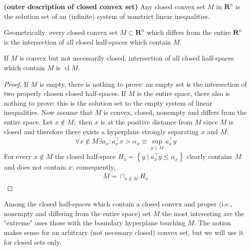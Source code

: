 \documentclass{article}
\newcommand{\bfs}[1]{\textbf{({#1}) }}
\newcommand{\cl}{\operatorname{cl}}
\begin{document}
\begin{thma}{\bfs{outer description of closed convex set}}
Any closed convex set $M$ in $\mathbf{R}^{n}$ is the solution set of an (infinite) system of nonstrict linear inequalities.

Geometrically: every closed convex set $M \subset \mathbf{R}^{n}$ which differs from the entire $\mathbf{R}^{n}$ is the intersection of all closed half-spaces which contain $M$.
\end{thma}
\begin{rema}
If $M$ is convex but not necessarily closed, intersection of all closed half-spaces which contain $M$ is $\cl M$. 
\end{rema}
\begin{proof}\color{ForestGreen}
If $M$ is empty, there is nothing to prove: an empty set is the intersection of two properly chosen closed half-spaces. If $M$ is the entire space, there also is nothing to prove: this is the solution set to the empty system of linear inequalities. Now assume that $M$ is convex, closed, nonempty and differs from the entire space. Let $x \notin M ;$ then $x$ is at the positive distance from $M$ since $M$ is closed and therefore there exists a hyperplane strongly separating $x$ and $M$:
\begin{align*}
\forall x \notin M \exists a_{x}: a_{x}^{\top} x>\alpha_{x} \equiv \sup _{y \in M} a_{x}^{\top} y
\end{align*}
For every $x \notin M$ the closed half-space $H_{x}=\left\{y \mid a_{x}^{\top} y \leq \alpha_{x}\right\}$ clearly contains $M$ and does not contain $x$; consequently,
\begin{align*}
M=\cap_{x \notin M} H_{x}
\end{align*}
\end{proof}

Among the closed half-spaces which contain a closed convex and proper (i.e., nonempty and differing from the entire space) set $M$ the most interesting are the "extreme" ones those with the boundary hyperplane touching $M$. The notion makes sense for an arbitrary (not necessary closed) convex set, but we will use it for closed sets only.
\end{document}
